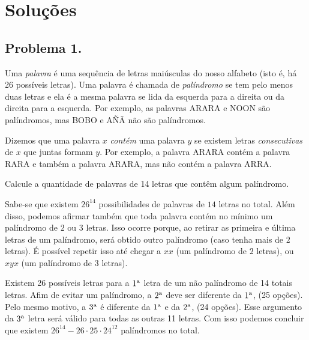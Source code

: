 \documentclass[12pt]{article}
\begin{document}
  \clearpage

  \section{\textsf{Soluções}}
    \subsection{Problema 1.}
      \begin{tcolorbox}[problembox={Enunciado do problema}]
        Uma \textit{palavra} é uma sequência de letras maiúsculas do
        nosso alfabeto (isto é, há 26 possíveis letras). Uma palavra é chamada de
        \textit{palíndromo} se tem pelo menos duas letras e ela é a mesma palavra se lida da
        esquerda para a direita ou da direita para a esquerda. Por exemplo, as palavras ARARA
        e NOON são palíndromos, mas BOBO e AÑÃ não são palíndromos.

        Dizemos que uma palavra $x$ \textit{contém} uma palavra $y$ se existem letras
        \textit{consecutivas} de $x$ que juntas formam $y$. Por exemplo, a palavra ARARA
        contém a palavra RARA e também a palavra ARARA, mas não contém a palavra ARRA.

        Calcule a quantidade de palavras de 14 letras que contêm algum palíndromo.
      \end{tcolorbox}
      Sabe-se que existem \(26^{14}\) possibilidades de palavras de \(14\) letras no total. Além disso, podemos afirmar também que toda palavra contém no mínimo um palíndromo de $2$ ou $3$ letras.
      Isso ocorre porque, ao retirar as primeira e última letras de um palíndromo, será obtido outro palíndromo (caso tenha mais de $2$ letras). É possível repetir isso até chegar
      a $xx$ (um palíndromo de $2$ letras), ou $xyx$ (um palíndromo de $3$ letras).
  
      Existem 26 possíveis letras para a \(1\textsuperscript{a}\) letra de um não palíndromo de 14 totais letras. Afim de evitar um palíndromo, a \(2\textsuperscript{a}\)
      deve ser diferente da \(1\textsuperscript{a}\), (25 opções). Pelo mesmo motivo, a \(3\textsuperscript{a}\) é diferente da \(1\textsuperscript{a}\) e da \(2\textsuperscript{a}\),
      (24 opções). Esse argumento da \(3\textsuperscript{a}\) letra será válido para todas as outras 11 letras. Com isso podemos concluir que existem \(26^{14} - 26 \cdot 25 \cdot 24^{12}\)
      palíndromos no total.
    
    \clearpage
\end{document}
